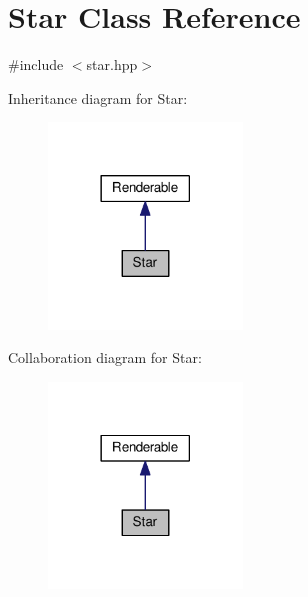 \hypertarget{class_star}{}\section{Star Class Reference}
\label{class_star}


{\ttfamily \#include $<$star.\+hpp$>$}



Inheritance diagram for Star\+:\nopagebreak
\begin{figure}[H]
\begin{center}
\leavevmode
\includegraphics[width=146pt]{class_star__inherit__graph}
\end{center}
\end{figure}


Collaboration diagram for Star\+:\nopagebreak
\begin{figure}[H]
\begin{center}
\leavevmode
\includegraphics[width=146pt]{class_star__coll__graph}
\end{center}
\end{figure}
